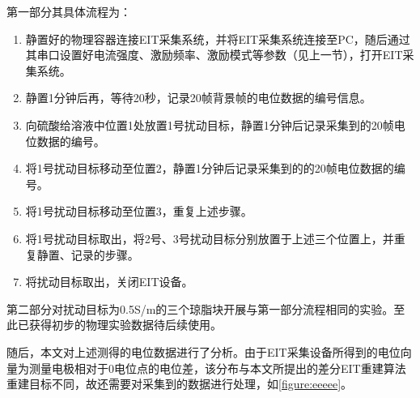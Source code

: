 第一部分其具体流程为：
\begin{enumerate}
    \item 静置好的物理容器连接EIT采集系统，并将EIT采集系统连接至PC，随后通过其串口设置好电流强度、激励频率、激励模式等参数（见上一节），打开EIT采集系统。
    \item 静置1分钟后再，等待20秒，记录20帧背景帧的电位数据的编号信息。
    \item 向硫酸给溶液中位置1处放置1号扰动目标，静置1分钟后记录采集到的20帧电位数据的编号。
    \item 将1号扰动目标移动至位置2，静置1分钟后记录采集到的的20帧电位数据的编号。
    \item 将1号扰动目标移动至位置3，重复上述步骤。
    \item 将1号扰动目标取出，将2号、3号扰动目标分别放置于上述三个位置上，并重复静置、记录的步骤。
    \item 将扰动目标取出，关闭EIT设备。
\end{enumerate}

第二部分对扰动目标为0.5S/m的三个琼脂块开展与第一部分流程相同的实验。至此已获得初步的物理实验数据待后续使用。

随后，本文对上述测得的电位数据进行了分析。由于EIT采集设备所得到的电位向量为测量电极相对于0电位点的电位差，该分布与本文所提出的差分EIT重建算法重建目标不同，故还需要对采集到的数据进行处理，如\cref{figure:eeeee}。

